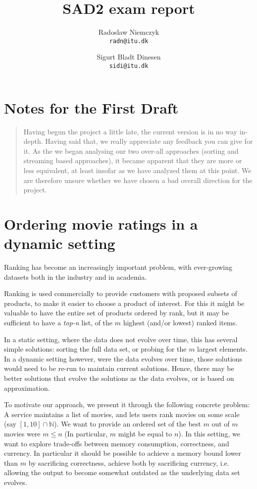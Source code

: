 \documentclass[a4paper, titlepage]{report}
\renewcommand{\%}{\scalebox{.9}{\oldpct}}
\begin{document}
\title{SAD2 exam report}
\author{
	Radoslaw Niemczyk
	\\\texttt{radn@itu.dk}
	\and
	Sigurt Bladt Dinesen
	\\\texttt{sidi@itu.dk}
}

\maketitle


\section*{Notes for the First Draft}
\begin{quote}
Having begun the project a little late, the current version is in no way
in-depth. Having said that, we really appreciate any feedback you can give for
it. As the we began analysing our two over-all approaches (sorting and streaming
based approaches), it became apparent that they are more or less equivalent, at
least insofar as we have analyzed them at this point. We are therefore unsure
whether we have chosen a bad overall direction for the project.
\end{quote}

\section*{Ordering movie ratings in a dynamic setting}
Ranking has become an increasingly important problem, with ever-growing datasets
both in the industry and in academia.

Ranking is used commercially to provide customers with proposed subsets of
products, to make it easier to choose a product of interest. For this it might
be valuable to have the entire set of products ordered by rank, but it may be
sufficient to have a \textit{top-n} list, of the $m$ highest (and/or lowest)
ranked items.

In a static setting, where the data does not evolve over time, this has several
simple solutions: sorting the full data set, or probing for the $m$ largest
elements. In a dynamic setting however, were the data evolves over time, those
solutions would need to be re-run to maintain current solutions. Hence, there
may be better solutions that evolve the solutions as the data evolves, or is
based on approximation.

To motivate our approach, we present it through the following concrete problem:
A service maintains a list of movies, and lets users rank movies on some scale
(say $\left[1,10\right]\cap \mathbb{N}$). We want to provide an ordered set of the best $m$ out of
$m$ movies were $m\leq n$ (In particular, $m$ might be equal to $n$).
In this setting, we want to explore trade-offs between memory consumption,
correctness, and  currency. In particular it should be possible to achieve a
memory bound lower than $m$ by sacrificing correctness, achieve both by
sacrificing currency, i.e. allowing the output to become somewhat outdated as
the underlying data set evolves.
\end{document}
